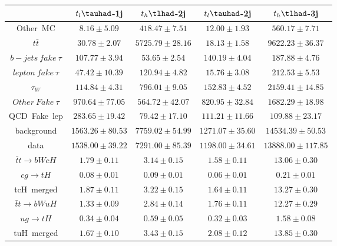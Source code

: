 \centering
\begin{tabular}{|c|c|c|c|c|} \hline
 & $t_{l}\tauhad$-1j & $t_{h}\tlhad$-2j & $t_{l}\tauhad$-2j & $t_{h}\tlhad$-3j\\\hline
Other~MC & $8.16\pm5.09$ & $418.47\pm7.51$ & $12.00\pm1.93$ & $560.17\pm7.71$\\\hline
$t\bar{t}$ & $30.78\pm2.07$ & $5725.79\pm28.16$ & $18.13\pm1.58$ & $9622.23\pm36.37$\\\hline
$b-jets~fake~\tau$ & $107.77\pm3.94$ & $53.65\pm2.54$ & $140.19\pm4.04$ & $187.88\pm4.76$\\\hline
$lepton~fake~\tau$ & $47.42\pm10.39$ & $120.94\pm4.82$ & $15.76\pm3.08$ & $212.53\pm5.53$\\\hline
$\tau_{W}$ & $114.84\pm4.31$ & $796.01\pm9.05$ & $152.83\pm4.52$ & $2159.41\pm14.85$\\\hline
$Other~Fake~\tau$ & $970.64\pm77.05$ & $564.72\pm42.07$ & $820.95\pm32.84$ & $1682.29\pm18.98$\\\hline
QCD~Fake~lep & $283.65\pm19.42$ & $79.42\pm17.10$ & $111.21\pm11.66$ & $109.88\pm23.17$\\\hline
background & $1563.26\pm80.53$ & $7759.02\pm54.99$ & $1271.07\pm35.60$ & $14534.39\pm50.53$\\\hline
data & $1538.00\pm39.22$ & $7291.00\pm85.39$ & $1198.00\pm34.61$ & $13888.00\pm117.85$\\\hline
$\bar{t}t\to bWcH$ & $1.79\pm0.11$ & $3.14\pm0.15$ & $1.58\pm0.11$ & $13.06\pm0.30$\\\hline
$cg\to tH$ & $0.08\pm0.01$ & $0.09\pm0.01$ & $0.06\pm0.01$ & $0.21\pm0.01$\\\hline
tcH~merged & $1.87\pm0.11$ & $3.22\pm0.15$ & $1.64\pm0.11$ & $13.27\pm0.30$\\\hline
$\bar{t}t\to bWuH$ & $1.33\pm0.09$ & $2.84\pm0.14$ & $1.76\pm0.11$ & $12.27\pm0.29$\\\hline
$ug\to tH$ & $0.34\pm0.04$ & $0.59\pm0.05$ & $0.32\pm0.03$ & $1.58\pm0.08$\\\hline
tuH~merged & $1.67\pm0.10$ & $3.43\pm0.15$ & $2.08\pm0.12$ & $13.85\pm0.30$\\\hline
\end{tabular}
